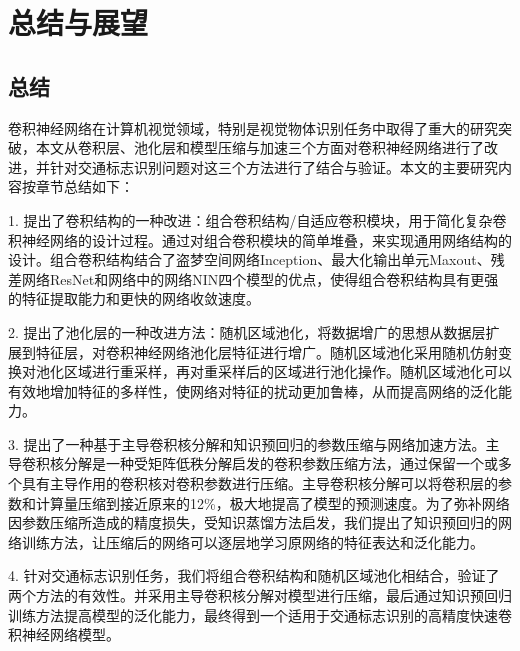 \chapter{总结与展望}
\label{cha:conclusion}

\section{总结}

卷积神经网络在计算机视觉领域，特别是视觉物体识别任务中取得了重大的研究突破，本文从卷积层、池化层和模型压缩与加速三个方面对卷积神经网络进行了改进，并针对交通标志识别问题对这三个方法进行了结合与验证。本文的主要研究内容按章节总结如下：

1. 提出了卷积结构的一种改进：组合卷积结构/自适应卷积模块，用于简化复杂卷积神经网络的设计过程。通过对组合卷积模块的简单堆叠，来实现通用网络结构的设计。组合卷积结构结合了盗梦空间网络Inception、最大化输出单元Maxout、残差网络ResNet和网络中的网络NIN四个模型的优点，使得组合卷积结构具有更强的特征提取能力和更快的网络收敛速度。

2. 提出了池化层的一种改进方法：随机区域池化，将数据增广的思想从数据层扩展到特征层，对卷积神经网络池化层特征进行增广。随机区域池化采用随机仿射变换对池化区域进行重采样，再对重采样后的区域进行池化操作。随机区域池化可以有效地增加特征的多样性，使网络对特征的扰动更加鲁棒，从而提高网络的泛化能力。

3. 提出了一种基于主导卷积核分解和知识预回归的参数压缩与网络加速方法。主导卷积核分解是一种受矩阵低秩分解启发的卷积参数压缩方法，通过保留一个或多个具有主导作用的卷积核对卷积参数进行压缩。主导卷积核分解可以将卷积层的参数和计算量压缩到接近原来的12\%，极大地提高了模型的预测速度。为了弥补网络因参数压缩所造成的精度损失，受知识蒸馏方法启发，我们提出了知识预回归的网络训练方法，让压缩后的网络可以逐层地学习原网络的特征表达和泛化能力。

4. 针对交通标志识别任务，我们将组合卷积结构和随机区域池化相结合，验证了两个方法的有效性。并采用主导卷积核分解对模型进行压缩，最后通过知识预回归训练方法提高模型的泛化能力，最终得到一个适用于交通标志识别的高精度快速卷积神经网络模型。


